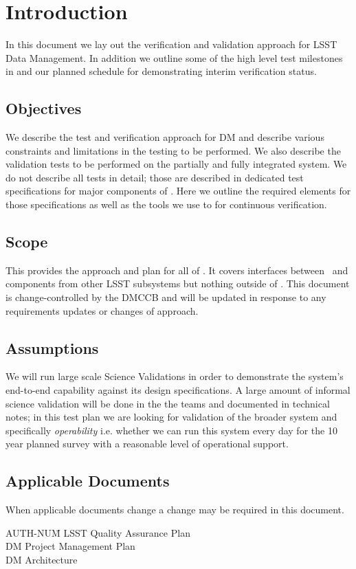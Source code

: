 
\section{Introduction \label{sect:intro}}
In this document  we lay out  the verification and validation approach for LSST Data Management. In addition we outline some of the high level test milestones in  and our planned schedule for demonstrating interim verification status.

\subsection{Objectives \label{sect:objectives}}

We describe the test and verification approach for DM and describe various constraints and limitations in the testing to be performed.
We also describe the validation tests to be performed on the partially and fully integrated system.
We do not describe all tests in detail; those are described in dedicated test specifications for major components of \product. Here we outline the required elements for those specifications as well as the tools we use to for continuous verification.

\subsection{Scope \label{sect:scope}}

This provides the approach and plan for all of \product. It covers interfaces between \product\ and components from other LSST subsystems but nothing outside of \product.
This document is change-controlled by the DMCCB and will be updated in response to any requirements updates or changes of approach.

\subsection{Assumptions}
We will run large scale Science Validations in order to demonstrate the system's end-to-end capability against its design specifications. A large amount of informal science validation will be done in the the teams and documented in technical notes; in this test plan we are looking for validation of the broader system and specifically \emph{operability} i.e. whether we can run this system every day for the 10 year planned survey with a reasonable level of operational support.

\subsection{Applicable Documents \label{sect:ad}}
When applicable documents change a change may be required in this document.
\begin{tabbing}
AUTH-NUM\= \kill
{}\>	LSST Quality  Assurance Plan \\
 \>	DM Project Management Plan   \\
\>	DM Architecture\\
\end{tabbing}

